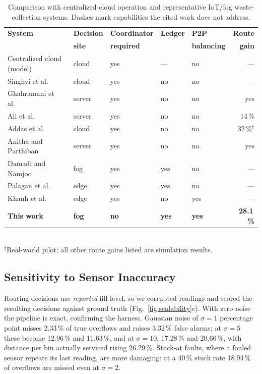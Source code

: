 \documentclass{llncs}
\begin{document}
\begin{table}[htbp]
\centering
\caption{Comparison with centralized cloud operation and representative
         IoT/fog waste-collection systems. Dashes mark capabilities the cited
         work does not address.}
\label{tab:comparison}
\footnotesize
\renewcommand{\arraystretch}{1.05}
\setlength{\tabcolsep}{4pt}
\begin{tabular}{lllllr}
\toprule
\textbf{System} & \textbf{Decision} & \textbf{Coordinator} & \textbf{Ledger} &
\textbf{P2P} & \textbf{Route}\\
 & \textbf{site} & \textbf{required} & & \textbf{balancing} & \textbf{gain}\\
\midrule
Centralized cloud (model)           & cloud  & yes & ---  & no  & --- \\
Singhvi et al.~\cite{singhvi}       & cloud  & yes & no   & no  & --- \\
Ghahramani et al.~\cite{ghahramani} & server & yes & no   & no  & yes \\
Ali et al.~\cite{ali}               & server & yes & no   & no  & 14\,\% \\
Addas et al.~\cite{addas}           & cloud  & yes & no   & no  & 32\,\%$^{\dagger}$ \\
Anitha and Parthiban~\cite{anitha}  & server & yes & no   & no  & yes \\
Damadi and Namjoo~\cite{damadi}     & fog    & yes & yes  & no  & --- \\
Palagan et al.~\cite{palagan}       & edge   & yes & yes  & no  & --- \\
Khanh et al.~\cite{khanh}           & edge   & yes & no   & yes & --- \\
\textbf{This work}                  & \textbf{fog} & \textbf{no} &
\textbf{yes} & \textbf{yes} & \textbf{28.1\,\%}\\
\bottomrule
\end{tabular}
\\[2pt]
\footnotesize $^{\dagger}$Real-world pilot; all other route gains listed are
simulation results.
\end{table}

\subsection{Sensitivity to Sensor Inaccuracy}
\label{sec:sensor}
Routing decisions use \emph{reported} fill level, so we corrupted readings and
scored the resulting decisions against ground truth
(Fig.~\ref{fig:scalability}c). With zero noise the pipeline is exact,
confirming the harness. Gaussian noise of $\sigma=1$ percentage point misses
2.33\,\% of true overflows and raises 3.32\,\% false alarms; at $\sigma=5$
these become 12.96\,\% and 11.63\,\%, and at $\sigma=10$, 17.28\,\% and
20.60\,\%, with distance per bin actually serviced rising 26.29\,\%. Stuck-at
faults, where a fouled sensor repeats its last reading, are more damaging: at a
40\,\% stuck rate 18.94\,\% of overflows are missed even at $\sigma=2$.
\end{document}
